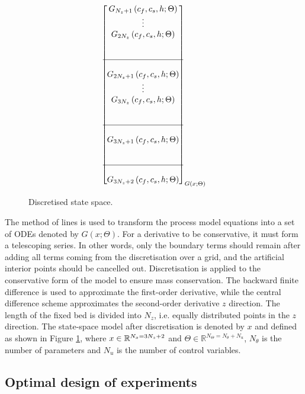 \documentclass[a4paper,fleqn]{cas-dc}
\begin{document}
\begin{figure}[!h]
{\begin{align*}
{\begin{bmatrix}
							G_{N_z+1} \left( c_f,c_s,h; \Theta \right)\\ 
							\vdots\\
							G_{2N_z} \left( c_f,c_s,h; \Theta \right)\\ 
							\\ \\ \hline \\ 
							G_{2N_z+1} \left( c_f,c_s,h; \Theta \right) \\
							\vdots\\
							G_{3N_z} \left( c_f,c_s,h; \Theta \right) \\ 
							\\ \\ \hline \\
							G_{3N_z+1} \left( c_f,c_s,h; \Theta \right) \\
							\\ \\ \hline \\
							G_{3N_z+2} \left( c_f,c_s,h; \Theta \right) 
					\end{bmatrix}}_{G \left( x; \Theta \right)} 
			\end{align*} }
			\caption{Discretised state space.}
			\label{fig:discretization}
		\end{figure}
		
		The method of lines is used to transform the process model equations into a set of ODEs denoted by $G(x;\Theta)$. For a derivative to be conservative, it must form a telescoping series. In other words, only the boundary terms should remain after adding all terms coming from the discretisation over a grid, and the artificial interior points should be cancelled out. Discretisation is applied to the conservative form of the model to ensure mass conservation. The backward finite difference is used to approximate the first-order derivative, while the central difference scheme approximates the second-order derivative $z$ direction. The length of the fixed bed is divided into $N_z$, i.e. equally distributed points in the $z$ direction. The state-space model after discretisation is denoted by $x$ and defined as shown in Figure \ref{fig:discretization}, where ${\color{black}x} \in \mathbb{R}^{N_x = 3N_z+2} $ and $\Theta \in \mathbb{R}^{N_\Theta =  N_{\theta} + N_u } $, $N_{\theta}$ is the number of parameters and $N_{u}$ is the number of control variables.
		
		\subsection{Optimal design of experiments} \label{CH: DOE}
\end{document}

